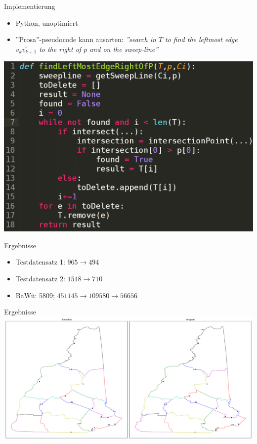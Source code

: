 \documentclass[14pt]{beamer}
\begin{document}
\begin{frame}{Implementierung}
\begin{itemize}
	\item Python, unoptimiert
	\item ''Prosa''-pseudocode kann ausarten: \emph{''search in $T$ to find the leftmost edge $\overline{v_kv_{k+1}}$ to the right of $p$ and on the
sweep-line''}
\end{itemize}

\includegraphics[width=.8\textwidth,center]{img/implvspseudo.png}
\end{frame}

\begin{frame}{Ergebnisse}
\begin{itemize}
	\item Testdatensatz 1: $965 \rightarrow 494$
	\item Testdatensatz 2: $1518 \rightarrow 710$
	\item BaWü: 5809; $451145 \rightarrow 109580 \rightarrow 56656$
\end{itemize}
\end{frame}

\begin{frame}{Ergebnisse}
\includegraphics[width=1.25\textwidth,center]{img/result_dataset1.pdf}
\end{frame}
\end{document}
